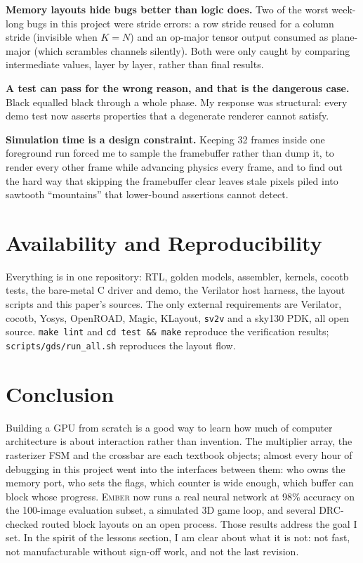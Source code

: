 \documentclass[conference]{IEEEtran}
\newcommand{\ember}{\textsc{Ember}}
\begin{document}
\textbf{Memory layouts hide bugs better than logic does.} Two of the worst
week-long bugs in this project were stride errors: a row stride reused for a
column stride (invisible when $K=N$) and an op-major tensor output consumed as
plane-major (which scrambles channels silently). Both were only caught by
comparing intermediate values, layer by layer, rather than final results.

\textbf{A test can pass for the wrong reason, and that is the dangerous case.}
Black equalled black through a whole phase. My response was structural: every
demo test now asserts properties that a degenerate renderer cannot satisfy.

\textbf{Simulation time is a design constraint.} Keeping 32 frames inside one
foreground run forced me to sample the framebuffer rather than dump it, to
render every other frame while advancing physics every frame, and to find out the
hard way that skipping the framebuffer clear leaves stale pixels piled into
sawtooth ``mountains'' that lower-bound assertions cannot detect.

\section{Availability and Reproducibility}

Everything is in one repository: RTL, golden models, assembler, kernels, cocotb
tests, the bare-metal C driver and demo, the Verilator host harness, the layout
scripts and this paper's sources. The only external requirements are
Verilator, cocotb, Yosys, OpenROAD, Magic, KLayout, \texttt{sv2v} and a
sky130 PDK, all open source. \texttt{make lint} and \texttt{cd test \&\& make}
reproduce the verification results; \texttt{scripts/gds/run\_all.sh} reproduces
the layout flow.

\section{Conclusion}

Building a GPU from scratch is a good way to learn how much of computer
architecture is about interaction rather than invention. The multiplier array,
the rasterizer FSM and the crossbar are each textbook objects; almost every
hour of debugging in this project went into the interfaces between them:
who owns the memory port, who sets the flags, which counter is wide enough,
which buffer can block whose progress. \ember{} now runs a real neural network
at 98\% accuracy on the 100-image evaluation subset, a simulated 3D game
loop, and several DRC-checked routed block layouts on an open process. Those results address the goal I set. In the spirit of the lessons
section, I am clear about what it is not: not
fast, not manufacturable without sign-off work, and not the last revision.
\end{document}
